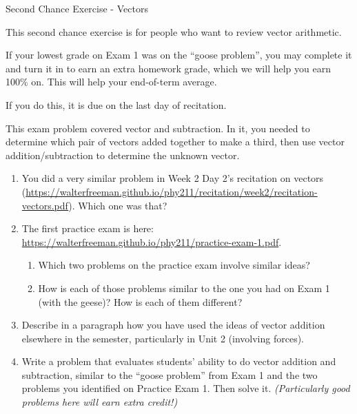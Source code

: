 \documentclass[12pt]{article}
\begin{document}
\begin{center}
\Large
\sc Second Chance Exercise - Vectors \rm





\normalsize
This second chance exercise is for people who want to review vector arithmetic. 

If your lowest grade on Exam 1 was on the ``goose problem'', you may complete it and turn it in to earn an extra homework grade, which we will help you earn 100\% on. This will help your end-of-term average.

If you do this, it is due on the last day of recitation.

\end{center}

\vspace{1.5in}

This exam problem covered vector and subtraction. In it, you needed to determine which pair of vectors added together to make a third, then use vector addition/subtraction to determine the unknown vector.

\begin{enumerate}
	\item You did a very similar problem in Week 2 Day 2's recitation on vectors (\url{https://walterfreeman.github.io/phy211/recitation/week2/recitation-vectors.pdf}). Which one was that?
	\item The first practice exam is here: \url{https://walterfreeman.github.io/phy211/practice-exam-1.pdf}. 
	\begin{enumerate}
		\item Which two problems on the practice exam involve similar ideas?
		\item How is each of those problems similar to the one you had on Exam 1 (with the geese)? How is each of them different?
	\end{enumerate}
    \item Describe in a paragraph how you have used the ideas of vector addition elsewhere in the semester, particularly in Unit 2 (involving forces). 
    \item Write a problem that evaluates students' ability to do vector addition and subtraction, similar to the ``goose problem'' from Exam 1 and the two problems you identified on Practice Exam 1. Then solve it. {\it (Particularly good problems here will earn extra credit!)}
\end{enumerate}
\end{document}
